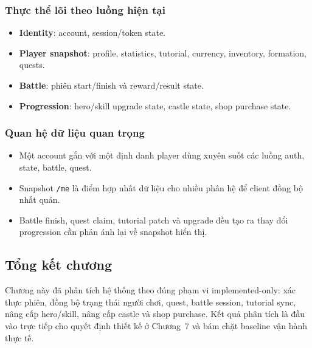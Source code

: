 \subsubsection{Thực thể lõi theo luồng hiện tại}
\label{subsec:analysis_entities}
\begin{itemize}
    \item \textbf{Identity}: account, session/token state.
    \item \textbf{Player snapshot}: profile, statistics, tutorial, currency, inventory, formation, quests.
    \item \textbf{Battle}: phiên start/finish và reward/result state.
    \item \textbf{Progression}: hero/skill upgrade state, castle state, shop purchase state.
\end{itemize}

\subsubsection{Quan hệ dữ liệu quan trọng}
\label{subsec:analysis_relationships}
\begin{itemize}
    \item Một account gắn với một định danh player dùng xuyên suốt các luồng auth, state, battle, quest.
    \item Snapshot \texttt{/me} là điểm hợp nhất dữ liệu cho nhiều phân hệ để client đồng bộ nhất quán.
    \item Battle finish, quest claim, tutorial patch và upgrade đều tạo ra thay đổi progression cần phản ánh lại về snapshot hiển thị.
\end{itemize}

\subsection{Tổng kết chương}
\label{subsec:analysis_summary}

Chương này đã phân tích hệ thống theo đúng phạm vi implemented-only: xác thực phiên, đồng bộ trạng thái người chơi, quest, battle session, tutorial sync, nâng cấp hero/\allowbreak skill, nâng cấp castle và shop purchase. Kết quả phân tích là đầu vào trực tiếp cho quyết định thiết kế ở Chương~7 và bám chặt baseline vận hành thực tế.
